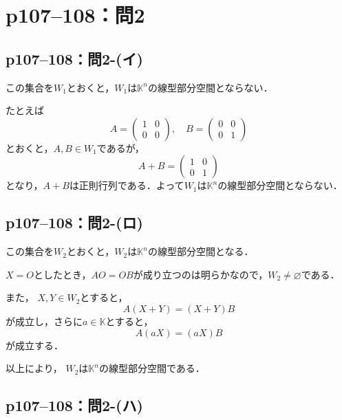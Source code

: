 \documentclass[a4paper,10pt,fleqn]{ltjsarticle}
\begin{document}
\section*{p107--108：問2}


\subsection*{p107--108：問2-(イ)}

\begin{tleftbar}この集合を$W_1$とおくと，$W_1$は$\mathbb{K}^n$の線型部分空間とならない．

  たとえば
  \[
    A = \begin{pmatrix} 1 & 0 \\ 0 & 0 \end{pmatrix},\quad B = \begin{pmatrix} 0 & 0 \\ 0 & 1 \end{pmatrix}
  \]
  とおくと，$ A , B \in W_1$であるが，
  \[
    A + B = \begin{pmatrix} 1 & 0 \\ 0 & 1 \end{pmatrix}
  \]
  となり，$A+B$は正則行列である．よって$W_1$は$\mathbb{K}^n$の線型部分空間とならない．
\end{tleftbar}


\subsection*{p107--108：問2-(ロ)}

\begin{tleftbar}
  この集合を$W_2$とおくと，$W_2$は$\mathbb{K}^n$の線型部分空間となる．

  $X =O$としたとき，$A O = OB$が成り立つのは明らかなので，$ W_2 \ne \varnothing$である．

  また， $X,Y \in W_2$とすると，
  \[
    A(X+Y)=(X+Y)B
  \]
  が成立し，さらに$ a\in \mathbb{K}$とすると，
  \[
    A(aX)=(aX)B
  \]
  が成立する．

  以上により， $W_2$は$\mathbb{K}^n$の線型部分空間である．
\end{tleftbar}

\subsection*{p107--108：問2-(ハ)}
\end{document}
